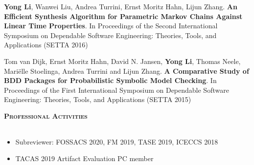 \documentclass[a4paper]{article}
\newcommand{\lineunder} {
    \vspace*{-8pt} \\
    \hspace*{-18pt} \hrulefill \\
}
\newcommand{\header} [1] {
    {\hspace*{-18pt}\vspace*{6pt} \textsc{#1}}
    \vspace*{-6pt} \lineunder
}
\begin{document}
\begin{CJK*}{UTF8}{gkai}
\begin{enumerate}[label={[\theenumi]},leftmargin=\parindent,align=left,labelwidth=\parindent,labelsep=4pt]
\item
\textbf{Yong Li}, Wanwei Liu, Andrea Turrini, Ernst Moritz Hahn, Lijun Zhang.
\textbf{An Efficient Synthesis Algorithm for Parametric Markov Chains Against Linear Time Properties}.
In Proceedings of the Second International Symposium on Dependable Software Engineering: Theories, Tools, and Applications (SETTA 2016)

\item 

Tom van Dijk, Ernst Moritz Hahn, David N. Jansen, \textbf{Yong Li}, Thomas Neele, Mari\"elle Stoelinga, Andrea Turrini and Lijun Zhang.
\textbf{A Comparative Study of BDD Packages for Probabilistic Symbolic Model Checking}.
In Proceedings of the First International Symposium on Dependable Software Engineering: Theories, Tools, and Applications (SETTA 2015)
\end{enumerate}





\fi




\nocite{*}

\header{\textbf{Professional Activities}}
\begin{itemize}

\item Subreviewer: FOSSACS 2020, FM 2019, TASE 2019, ICECCS 2018

\item TACAS 2019 Artifact Evaluation PC member

\end{itemize}


\end{CJK*}
\end{document}
